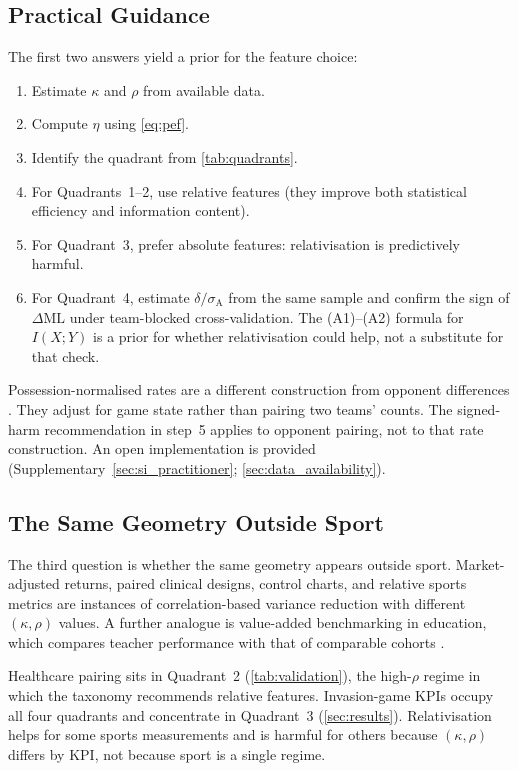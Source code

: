 \subsection{Practical Guidance}
\label{sec:practical_guidance}

The first two answers yield a prior for the feature choice:
\begin{enumerate}
  \item Estimate $\kappa$ and $\rho$ from available data.
  \item Compute $\eta$ using \cref{eq:pef}.
  \item Identify the quadrant from \cref{tab:quadrants}.
  \item For Quadrants~1--2, use relative features (they improve both statistical efficiency and information content).
  \item For Quadrant~3, prefer absolute features: relativisation is predictively harmful.
  \item For Quadrant~4, estimate $\delta/\sigma_{\mathrm{A}}$ from the same sample and confirm the sign of $\Delta\mathrm{ML}$ under team-blocked cross-validation. The (A1)--(A2) formula for $I(X;Y)$ is a prior for whether relativisation could help, not a substitute for that check.
\end{enumerate}
Possession-normalised rates are a different construction from opponent differences \parencite{sever2026}. They adjust for game state rather than pairing two teams' counts. The signed-harm recommendation in step~5 applies to opponent pairing, not to that rate construction. An open implementation is provided (Supplementary~\cref{sec:si_practitioner}; \cref{sec:data_availability}).

\subsection{The Same Geometry Outside Sport}

The third question is whether the same geometry appears outside sport. Market-adjusted returns, paired clinical designs, control charts, and relative sports metrics are instances of correlation-based variance reduction with different $(\kappa,\rho)$ values. A further analogue is value-added benchmarking in education, which compares teacher performance with that of comparable cohorts \parencite{hanushek2010}.

Healthcare pairing sits in Quadrant~2 (\cref{tab:validation}), the high-$\rho$ regime in which the taxonomy recommends relative features. Invasion-game KPIs occupy all four quadrants and concentrate in Quadrant~3 (\cref{sec:results}). Relativisation helps for some sports measurements and is harmful for others because $(\kappa,\rho)$ differs by KPI, not because sport is a single regime.

